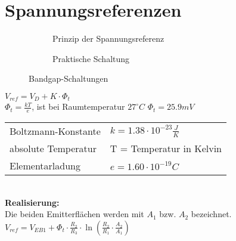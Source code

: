 \section{Spannungsreferenzen}
\begin{figure}[!h]
	\centering
	\begin{subfigure}[b]{10cm}
		\centering
		{}
		\caption{Prinzip der Spannungsreferenz}
	\end{subfigure}\qquad
	\begin{subfigure}[b]{8cm}
		\centering
		{}
		\caption{Praktische Schaltung}
	\end{subfigure}
	\caption{Bandgap-Schaltungen}
	\label{fig:spannungsreferenzen}
\end{figure}

$V_{ref}=V_D+K\cdot \Phi_t$\\
$\Phi_t = \frac{kT}{e}$, ist bei Raumtemperatur $27^\circ C$ $\Phi_t=25.9mV$\\
\begin{tabular}{ll}
Boltzmann-Konstante & $k=1.38\cdot 10^{-23}\frac{J}{K}$\\
absolute Temperatur & T = Temperatur in Kelvin\\
Elementarladung & $e=1.60\cdot 10^{-19}C$\\
\end{tabular}\\
\textbf{Realisierung:}\\
Die beiden Emitterflächen werden mit $A_1$ bzw. $A_2$ bezeichnet.\\
$V_{ref}=V_{EB1}+\Phi_t\cdot\frac{R_2}{R_3}\cdot\ln\left(\frac{R_2}{R_1}\cdot\frac{A_2}{A_1}\right)$